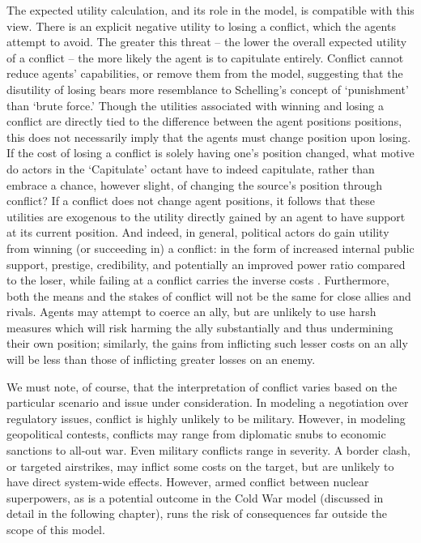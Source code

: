 The expected utility calculation, and its role in the model, is compatible with this view. There is an explicit negative utility to losing a conflict, which the agents attempt to avoid. The greater this threat -- the lower the overall expected utility of a conflict -- the more likely the agent is to capitulate entirely. Conflict cannot reduce agents' capabilities, or remove them from the model, suggesting that the disutility of losing bears more resemblance to Schelling's concept of `punishment' than `brute force.' Though the utilities associated with winning and losing a conflict are directly tied to the difference between the agent positions positions, this does not necessarily imply that the agents must change position upon losing. If the cost of losing a conflict is solely having one's position changed, what motive do actors in the `Capitulate' octant have to indeed capitulate, rather than embrace a chance, however slight, of changing the source's position through conflict? If a conflict does not change agent positions, it follows that these utilities are exogenous to the utility directly gained by an agent to have support at its current position. And indeed, in general, political actors do gain utility from winning (or succeeding in) a conflict: in the form of increased internal public support, prestige, credibility, and potentially an improved power ratio compared to the loser, while failing at a conflict carries the inverse costs \citep{bratton_2005}. Furthermore, both the means and the stakes of conflict will not be the same for close allies and rivals. Agents may attempt to coerce an ally, but are unlikely to use harsh measures which will risk harming the ally substantially and thus undermining their own position; similarly, the gains from inflicting such lesser costs on an ally will be less than those of inflicting greater losses on an enemy. 

We must note, of course, that the interpretation of conflict varies based on the particular scenario and issue under consideration. In modeling a negotiation over regulatory issues, conflict is highly unlikely to be military. However, in modeling geopolitical contests, conflicts may range from diplomatic snubs to economic sanctions to all-out war. Even military conflicts range in severity. A border clash, or targeted airstrikes, may inflict some costs on the target, but are unlikely to have direct system-wide effects. However, armed conflict between nuclear superpowers, as is a potential outcome in the \citet{bdm_1998} Cold War model (discussed in detail in the following chapter), runs the risk of consequences far outside the scope of this model.

